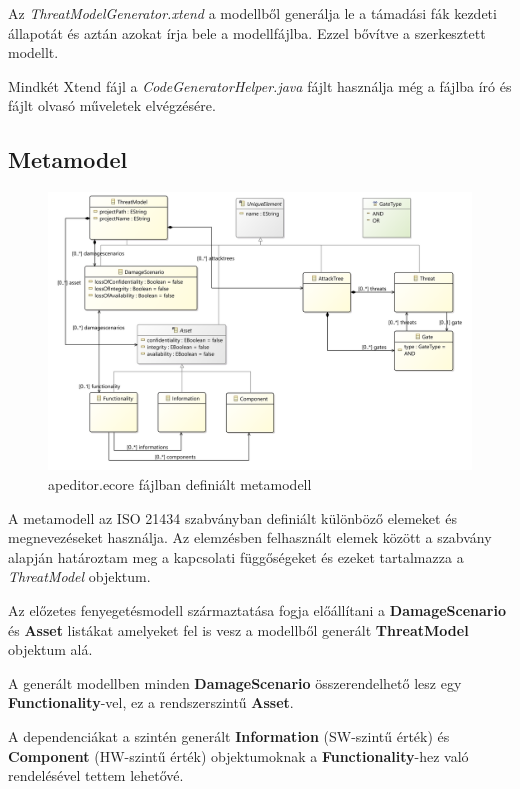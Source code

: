 Az \textit{ThreatModelGenerator.xtend} a modellből generálja le a támadási fák kezdeti állapotát és aztán azokat írja bele a modellfájlba. Ezzel bővítve a szerkesztett modellt.

Mindkét Xtend fájl a \textit{CodeGeneratorHelper.java} fájlt használja még a fájlba író és fájlt olvasó műveletek elvégzésére.

\subsection{Metamodel}

\begin{figure}[!ht]
	\centering
	\includegraphics[width=130mm, keepaspectratio]{figures/05_metamodel.png}
	\caption{apeditor.ecore fájlban definiált metamodell}
	\label{fig:05_metamodel}
\end{figure}

A metamodell az ISO 21434 szabványban definiált különböző elemeket és megnevezéseket használja. Az elemzésben felhasznált elemek között a szabvány alapján határoztam meg a kapcsolati függőségeket és ezeket tartalmazza a \textit{ThreatModel} objektum.

Az előzetes fenyegetésmodell származtatása fogja előállítani a \textbf{DamageScenario} és \textbf{Asset} listákat amelyeket fel is vesz a modellből generált \textbf{ThreatModel} objektum alá.

A generált modellben minden \textbf{DamageScenario} összerendelhető lesz egy \textbf{Functionality}-vel, ez a rendszerszintű \textbf{Asset}.

A dependenciákat a szintén generált \textbf{Information} (SW-szintű érték) és \textbf{Component} (HW-szintű érték) objektumoknak a \textbf{Functionality}-hez való rendelésével tettem lehetővé.

